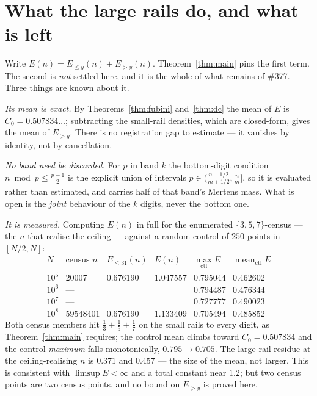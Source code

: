 \documentclass[11pt]{article}
\begin{document}
\section{What the large rails do, and what is left}\label{sec:large}

Write $E(n)=E_{\le y}(n)+E_{>y}(n)$.  Theorem~\ref{thm:main} pins the first
term.  The second is \emph{not} settled here, and it is the whole of what
remains of \#377.  Three things are known about it.

\emph{Its mean is exact.}  By Theorems~\ref{thm:fubini} and~\ref{thm:dc} the
mean of $E$ is $C_0=0.507834\ldots$; subtracting the small-rail densities, which
are closed-form, gives the mean of $E_{>y}$.  There is no registration gap to
estimate --- it vanishes by identity, not by cancellation.

\emph{No band need be discarded.}  For $p$ in band $k$ the bottom-digit
condition $n\bmod p\le\frac{p-1}2$ is the explicit union of intervals
$p\in\bigl(\frac{n+1/2}{m+1/2},\frac nm\bigr]$, so it is evaluated rather than
estimated, and carries half of that band's Mertens mass.  What is open is the
\emph{joint} behaviour of the $k$ digits, never the bottom one.

\emph{It is measured.}  Computing $E(n)$ in full for the enumerated
$\{3,5,7\}$-census --- the $n$ that realise the ceiling --- against a random
control of $250$ points in $[N/2,N]$:
\[
\begin{array}{r|ccc|cc}
 N & \text{census }n & E_{\le31}(n) & E(n) & \max_{\mathrm{ctl}}E & \operatorname{mean}_{\mathrm{ctl}}E\\\hline
 10^{5} & 20007      & 0.676190 & 1.047557 & 0.795044 & 0.462602\\
 10^{6} & \text{---} &          &          & 0.794487 & 0.476344\\
 10^{7} & \text{---} &          &          & 0.727777 & 0.490023\\
 10^{8} & 59548401   & 0.676190 & 1.133409 & 0.705494 & 0.485852
\end{array}
\]
Both census members hit $\frac13+\frac15+\frac17$ on the small rails to every
digit, as Theorem~\ref{thm:main} requires; the control mean climbs toward
$C_0=0.507834$ and the control \emph{maximum} falls monotonically,
$0.795\to0.705$.  The large-rail residue at the ceiling-realising $n$ is $0.371$
and $0.457$ --- the size of the mean, not larger.  This is consistent with
$\limsup E<\infty$ and a total constant near $1.2$; but two census points are
two census points, and no bound on $E_{>y}$ is proved here.
\end{document}
